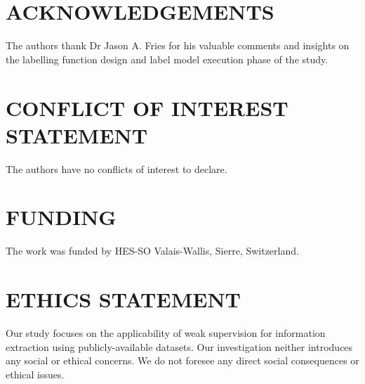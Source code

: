 \documentclass[10.7pt,]{article}
\begin{document}
\section{ACKNOWLEDGEMENTS}\label{acknowledgements}
%
The authors thank Dr Jason A. Fries for his valuable comments and insights on the labelling function design and label model execution phase of the study. 
%
\section{CONFLICT OF INTEREST STATEMENT}\label{conflictinterest}
%
The authors have no conflicts of interest to declare.
%
\section{FUNDING}\label{funding}
%
The work was funded by HES-SO Valais-Wallis, Sierre, Switzerland.
%
\section{ETHICS STATEMENT}\label{ethic}
%
Our study focuses on the applicability of weak supervision for information extraction using publicly-available datasets.
Our investigation neither introduces any social or ethical concerns.
We do not foresee any direct social consequences or ethical issues.
%
\printbibliography
%
%


%
%
%
\end{document}
